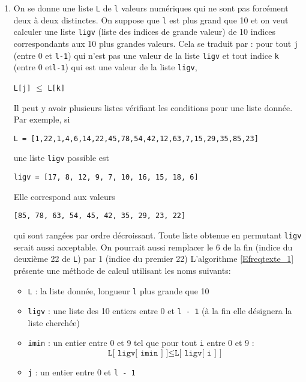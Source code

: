 \begin{enumerate}
  \item On se donne une liste \texttt{L} de \texttt{l} valeurs numériques qui ne sont pas forcément deux à deux distinctes. On suppose que \texttt{l} est plus grand que 10 et on veut calculer une liste \texttt{ligv} (liste des indices de grande valeur) de 10 indices correspondants aux 10 plus grandes valeurs. \newline
  Cela se traduit par : pour tout \texttt{j} (entre 0 et \texttt{l-1}) qui n'est pas une valeur de la liste \texttt{ligv} et tout indice \texttt{k} (entre 0 et\texttt{l-1}) qui est une valeur de la liste \texttt{ligv}, 
  \begin{center}
    \texttt{L[j]} $\leq$ \texttt{L[k]} 
  \end{center}
Il peut y avoir plusieurs listes vérifiant les conditions pour une liste donnée. Par exemple, si
\begin{center}
  \verb|L = [1,22,1,4,6,14,22,45,78,54,42,12,63,7,15,29,35,85,23]|  
\end{center}
une liste \texttt{ligv} possible est
\begin{center}
  \verb|ligv = [17, 8, 12, 9, 7, 10, 16, 15, 18, 6]|
\end{center}
Elle correspond aux valeurs
\begin{center}
\verb|[85, 78, 63, 54, 45, 42, 35, 29, 23, 22]|  
\end{center}
qui sont rangées par ordre décroissant.\newline
Toute liste obtenue en permutant \texttt{ligv} serait aussi acceptable. On pourrait aussi remplacer le 6 de la fin (indice du deuxième 22 de \texttt{L}) par 1 (indice du premier 22)\newline  
L'algorithme \ref{Efreqtexte_1} présente une méthode de calcul utilisant les noms suivants:
\begin{itemize}
  \item \texttt{L} : la liste donnée, longueur \texttt{l} plus grande que 10
  \item \texttt{ligv} : une liste des 10 entiers entre 0 et \texttt{l - 1} (à la fin elle désignera la liste cherchée)  
  \item \texttt{imin} : un entier entre 0 et 9 tel que pour tout \texttt{i} entre 0 et 9 :
  \begin{displaymath}
  \texttt{L[ ligv[ imin ] ]} \leq  \texttt{L[ ligv[ i ] ]}
  \end{displaymath}
  \item \texttt{j} : un entier entre 0 et \texttt{l - 1}
\end{itemize}

\end{enumerate}
